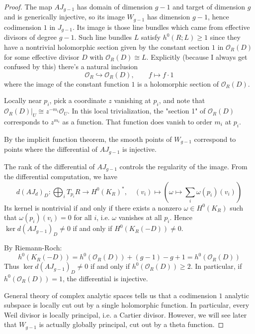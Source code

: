 \documentclass[12pt]{article}
\begin{document}
\begin{proof}
    The map $AJ_{g-1}$ has domain of dimension $g-1$ and target of dimension $g$ and is generically injective, so its image $W_{g-1}$ has dimension $g-1$, hence codimension $1$ in $J_{g-1}$. Its image is those line bundles which came from effective divisors of degree $g-1$. Such line bundles $L$ satisfy $h^0(R;L) \geq 1$ since they have a nontrivial holomorphic section given by the constant section $1$ in $\mathcal{O}_R(D)$ for some effective divisor $D$ with $\mathcal{O}_R(D) \cong L$. Explicitly (because I always get confused by this) there's a natural inclusion
\[\mathcal O_R \hookrightarrow \mathcal O_R(D),\qquad
f \longmapsto f\cdot 1\]
where the image of the constant function $1$ is a holomorphic section of $\mathcal{O}_R(D)$. 

Locally near $p_i$, pick a coordinate $z$ vanishing at $p_i$, and note that $\mathcal{O}_R(D)|_U \cong z^{-m_i}\mathcal{O}_U$. In this local trivialization, the "section 1" of $\mathcal{O}_R(D)$ corresponds to $z^{m_i}$ as a function. That function does vanish to order $m_i$ at $p_i$.

    By the implicit function theorem, the smooth points of $W_{g-1}$ correspond to points where the differential of $AJ_{g-1}$ is injective.

    The rank of the differential of $AJ_{g-1}$ controls the regularity of the image. From the differential computation, we have
    \[
    d(AJ_d)_D : \bigoplus_i T_{p_i}R \to H^0(K_R)^*, \quad (v_i) \mapsto (\omega\mapsto \sum_i\omega(p_i)(v_i))
    \]
    Its kernel is nontrivial if and only if there exists a nonzero $\omega\in H^0(K_R)$ such that $\omega(p_i)(v_i)=0$ for all $i$, i.e. $\omega$ vanishes at all $p_i$. Hence $\ker d(AJ_{g-1})_D \neq 0$ if and only if $H^0(K_R(-D))\neq 0$.

    By Riemann-Roch:
    \[
    h^0(K_R(-D)) = h^0(\mathcal{O}_R(D)) + (g-1) - g + 1 = h^0(\mathcal{O}_R(D))
    \]
    Thus $\ker d(AJ_{g-1})_D \neq 0$ if and only if $h^0(\mathcal{O}_R(D)) \geq 2$. In particular, if $h^0(\mathcal{O}_R(D)) = 1$, the differential is injective.

    General theory of complex analytic spaces tells us that a codimension $1$ analytic subspace is locally cut out by a single holomorphic function. In particular, every Weil divisor is locally principal, i.e. a Cartier divisor. However, we will see later that $W_{g-1}$ is actually globally principal, cut out by a theta function.
\end{proof}
\end{document}

